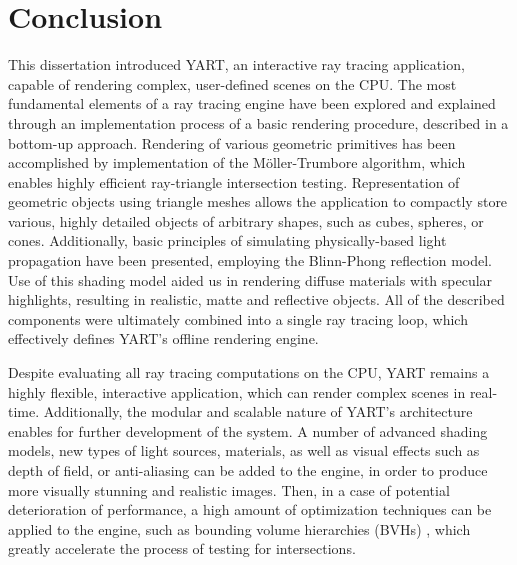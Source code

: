 
\chapter{Conclusion} \label{ch:Conclusion}

This dissertation introduced YART, an interactive ray tracing application, capable of rendering complex, user-defined scenes on the CPU.
The most fundamental elements of a ray tracing engine have been explored and explained through an implementation process of a basic rendering procedure, described in a bottom-up approach.
Rendering of various geometric primitives has been accomplished by implementation of the M{\"o}ller-Trumbore algorithm, which enables highly efficient ray-triangle intersection testing.
Representation of geometric objects using triangle meshes allows the application to compactly store various, highly detailed objects of arbitrary shapes, such as cubes, spheres, or cones. 
Additionally, basic principles of simulating physically-based light propagation have been presented, employing the Blinn-Phong reflection model. 
Use of this shading model aided us in rendering diffuse materials with specular highlights, resulting in realistic, matte and reflective objects.
All of the described components were ultimately combined into a single ray tracing loop, which effectively defines YART's offline rendering engine. 

Despite evaluating all ray tracing computations on the CPU, YART remains a highly flexible, interactive application, which can render complex scenes in real-time.
Additionally, the modular and scalable nature of YART's architecture enables for further development of the system.
A number of advanced shading models, new types of light sources, materials, as well as visual effects such as depth of field, or anti-aliasing can be added to the engine, in order to produce more visually stunning and realistic images.
Then, in a case of potential deterioration of performance, a high amount of optimization techniques can be applied to the engine, such as bounding volume hierarchies (BVHs) \supercite{Wald2007}, which greatly accelerate the process of testing for intersections.  
